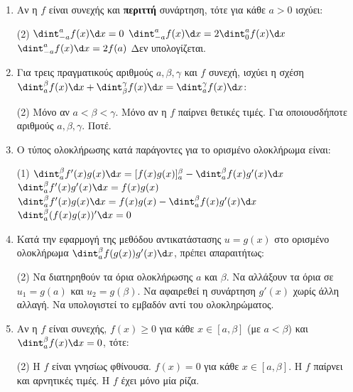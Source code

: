\begin{enumerate}[label=\textbf{3.\arabic*.}, itemsep=4mm]
    \item Αν η $f$ είναι συνεχής και \textbf{περιττή} συνάρτηση, τότε για κάθε $a > 0$ ισχύει:
    \begin{tasks}[label=\let\textdexiakeraia\relax\alph*.](2)
        \task $\dint_{-a}^a f(x) \d x = 0$
        \task $\dint_{-a}^a f(x) \d x = 2\dint_0^a f(x) \d x$
        \task $\dint_{-a}^a f(x) \d x = 2f(a)$
        \task Δεν υπολογίζεται.
    \end{tasks}

    \item Για τρεις πραγματικούς αριθμούς $a, \beta, \gamma$ και $f$ συνεχή, ισχύει η σχέση $\dint_a^\beta f(x)\d x + \dint_\beta^\gamma f(x)\d x = \dint_a^\gamma f(x)\d x$:
    \begin{tasks}[label=\let\textdexiakeraia\relax\alph*.](2)
        \task Μόνο αν $a < \beta < \gamma$.
        \task Μόνο αν η $f$ παίρνει θετικές τιμές.
        \task Για οποιουσδήποτε αριθμούς $a, \beta, \gamma$.
        \task Ποτέ.
    \end{tasks}

    \item Ο τύπος ολοκλήρωσης κατά παράγοντες για το ορισμένο ολοκλήρωμα είναι:
    \begin{tasks}[label=\let\textdexiakeraia\relax\alph*.](1)
        \task $\dint_a^\beta f'(x)g(x)\d x = [f(x)g(x)]_a^\beta - \dint_a^\beta f(x)g'(x)\d x$
        \task $\dint_a^\beta f'(x)g'(x)\d x = f(x)g(x)$
        \task $\dint_a^\beta f'(x)g(x)\d x = f(x)g(x) - \dint_a^\beta f(x)g'(x)\d x$
        \task $\dint_a^\beta (f(x)g(x))'\d x = 0$
    \end{tasks}

    \item Κατά την εφαρμογή της μεθόδου αντικατάστασης $u = g(x)$ στο ορισμένο ολοκλήρωμα $\dint_a^\beta f(g(x))g'(x)\d x$, πρέπει απαραιτήτως:
    \begin{tasks}[label=\let\textdexiakeraia\relax\alph*.](2)
        \task Να διατηρηθούν τα όρια ολοκλήρωσης $a$ και $\beta$.
        \task Να αλλάξουν τα όρια σε $u_1 = g(a)$ και $u_2 = g(\beta)$.
        \task Να αφαιρεθεί η συνάρτηση $g'(x)$ χωρίς άλλη αλλαγή.
        \task Να υπολογιστεί το εμβαδόν αντί του ολοκληρώματος.
    \end{tasks}

    \item Αν η $f$ είναι συνεχής, $f(x) \ge 0$ για κάθε $x \in [a, \beta]$ (με $a<\beta$) και $\dint_a^\beta f(x)\d x = 0$, τότε:
    \begin{tasks}[label=\let\textdexiakeraia\relax\alph*.](2)
        \task Η $f$ είναι γνησίως φθίνουσα.
        \task $f(x) = 0$ για κάθε $x \in [a, \beta]$.
        \task Η $f$ παίρνει και αρνητικές τιμές.
        \task Η $f$ έχει μόνο μία ρίζα.
    \end{tasks}


\end{enumerate}
